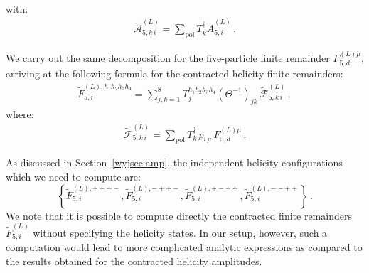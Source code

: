 \documentclass[main.tex]{subfiles}
\begin{document}
with:
\begin{align} \label{Wyjeq:Asumpol}
\tilde{\mathcal{A}}_{5,k \, i}^{(L)}  = \sum_{\text{pol}} {T}_{k}^\dagger \tilde{A}_{5,i}^{(L)} \,.
\end{align}

We carry out the same decomposition for the five-particle finite remainder $F_{5,d}^{(L)\mu}$, arriving at the following formula for the contracted helicity finite remainders:
\begin{align}
\label{Wyjeq:FA5Ldef}
\tilde{F}_{5,i}^{(L),h_1 h_2 h_3 h_4} = \sum_{j,k=1}^{8} T_{j}^{h_1 h_2 h_3 h_4} \left(\Theta^{-1}\right)_{jk}  \, \tilde{\mathcal{F}}_{5,k \, i}^{(L)}\,,
\end{align}
where:
\begin{align} \label{Wyjeq:FA5Ldefpt2}
\tilde{\mathcal{F}}_{5,k \, i}^{(L)}  = \sum_{\text{pol}} {T}_{k}^\dagger  \, p_{i \, \mu} \, F_{5,d}^{(L) \mu}  \,.
\end{align}

As discussed in Section~\ref{wyjsec:amp}, the independent helicity configurations which we need to compute are:
\begin{equation} \label{Wyjeq:indephel}
\left\{
\tilde{F}_{5,i}^{(L),+++-}, 
\tilde{F}_{5,i}^{(L),-++-}, 
\tilde{F}_{5,i}^{(L),+-++}, 
\tilde{F}_{5,i}^{(L),--++}
\right\} \,.
\end{equation}
We note that it is possible to compute directly the contracted finite remainders $\tilde{F}^{(L)}_{5,i}$ without specifying the helicity states. In our setup, however, such a computation would lead to more complicated analytic expressions as compared to the results obtained for the contracted helicity amplitudes. 
\end{document}
